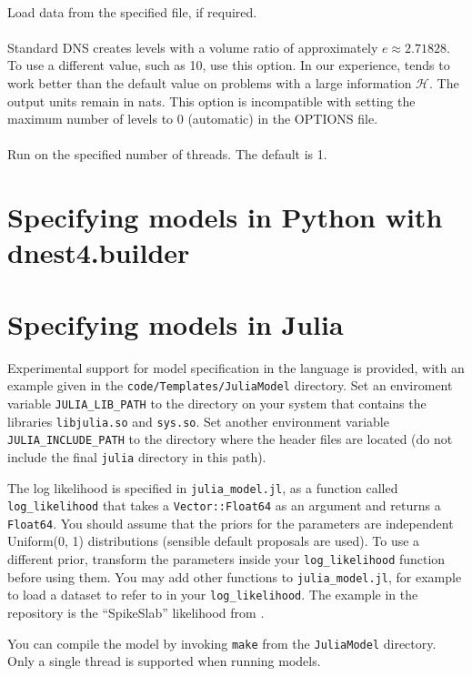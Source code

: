 \documentclass[article]{jss}
\begin{document}
\\
Load data from the specified file, if required.\\

\\
Standard DNS creates levels with a volume ratio of approximately
$e\approx 2.71828$. To use a different value, such as 10, use this option.
In our experience,  tends to work better than the default
value on problems with a large information $\mathcal{H}$.
The output units remain in nats.
This option is incompatible with setting the maximum number of levels to 0
(automatic) in the OPTIONS file.
\\

\\
Run on the specified number of threads. The default is 1.

\section{Specifying models in Python with dnest4.builder}


\section{Specifying models in Julia}
Experimental support for model specification in the
 language is provided, with an example given in the
{\tt code/Templates/JuliaModel} directory.
Set an enviroment variable {\tt JULIA\_LIB\_PATH} to the directory on your
system that contains the libraries {\tt libjulia.so} and
{\tt sys.so}. Set another environment variable {\tt JULIA\_INCLUDE\_PATH}
to the directory where the  header files are located
(do not include the final {\tt julia} directory in this path).

The log likelihood is specified in {\tt julia\_model.jl}, as a function
called {\tt log\_likelihood} that takes a {\tt Vector::Float64} as an argument
and returns a {\tt Float64}. You should assume that the priors for the
parameters are independent Uniform(0, 1) distributions (sensible default
proposals are used). To use a different prior, transform the parameters inside
your {\tt log\_likelihood} function before using them.
You may add other functions to {\tt julia\_model.jl}, for example to load
a dataset to refer to in your {\tt log\_likelihood}. The example in
the repository is the ``SpikeSlab'' likelihood from \citet{dnest}.

You can compile the model by invoking {\tt make}
from the {\tt JuliaModel} directory.
Only a single thread is supported when running 
models.
\end{document}
